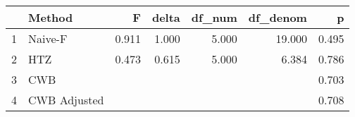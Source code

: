 \begin{table}[ht]
\centering
\begin{tabular}{rlrrrrr}
  \hline
 & Method & F & delta & df\_num & df\_denom & p \\ 
  \hline
1 & Naive-F & 0.911 & 1.000 & 5.000 & 19.000 & 0.495 \\ 
  2 & HTZ & 0.473 & 0.615 & 5.000 & 6.384 & 0.786 \\ 
  3 & CWB &  &  &  &  & 0.703 \\ 
  4 & CWB Adjusted &  &  &  &  & 0.708 \\ 
   \hline
\end{tabular}
\end{table}
